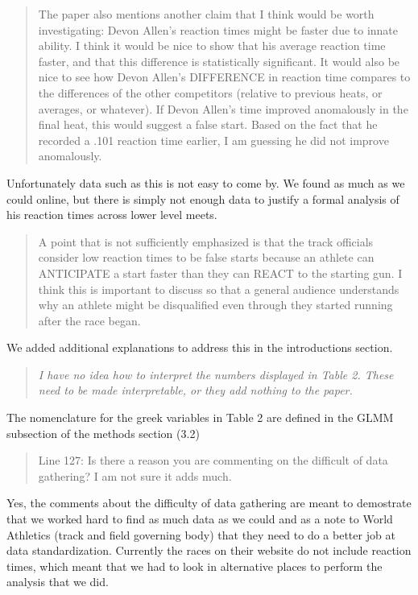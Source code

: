 \documentclass[12pt]{article}
\newenvironment{comment}%
{\begin{quotation}\noindent\small\it\color{darkblue}\ignorespaces%
}{\end{quotation}}
\begin{document}
\begin{comment}
The paper also mentions another claim that I think would be worth investigating:
Devon Allen’s reaction times might be faster due to innate ability. I think it
would be nice to show that his average reaction time faster, and that this
difference is statistically significant. It would also be nice to see how Devon
Allen’s DIFFERENCE in reaction time compares to the differences of the other
competitors (relative to previous heats, or averages, or whatever). If Devon
Allen’s time improved anomalously in the final heat, this would suggest a false
start. Based on the fact that he recorded a .101 reaction time earlier, I am
guessing he did not improve anomalously.  
\end{comment}

Unfortunately data such as this is not easy to come by.  We found as much as we
could online, but there is simply not enough data to justify a formal analysis
of his reaction times across lower level meets.

\begin{comment}
A point that is not sufficiently emphasized is that the track officials consider
low reaction times to be false starts because an athlete can ANTICIPATE a start
faster than they can REACT to the starting gun. I think this is important to
discuss so that a general audience understands why an athlete might be
disqualified even through they started running after the race began.  
\end{comment}

We added additional explanations to address this in the introductions section.

\begin{comment}I have no idea how to interpret the numbers displayed in Table 2. These
need to be made interpretable, or they add nothing to the paper.
\end{comment}

The nomenclature for the greek variables in Table 2 are defined in the GLMM
subsection of the methods section (3.2)

\begin{comment}
Line 127: Is there a reason you are commenting on the difficult of data
gathering? I am not sure it adds much.
\end{comment}

Yes, the comments about the difficulty of data gathering are meant to demostrate
that we worked hard to find as much data as we could and as a note to World
Athletics (track and field governing body) that they need to do a better job
at data standardization.  Currently the races on their website do not include
reaction times, which meant that we had to look in alternative places to perform
the analysis that we did.
\end{document}
